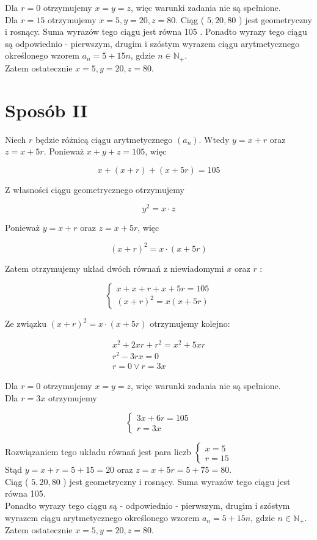 \documentclass[10pt]{article}
\begin{document}
Dla $r=0$ otrzymujemy $x=y=z$, więc warunki zadania nie są spełnione.\\
Dla $r=15$ otrzymujemy $x=5, y=20, z=80$. Ciąg ( $5,20,80$ ) jest geometryczny i rosnący. Suma wyrazów tego ciągu jest równa 105 . Ponadto wyrazy tego ciągu są odpowiednio - pierwszym, drugim i szóstym wyrazem ciągu arytmetycznego określonego wzorem $a_{n}=5+15 n$, gdzie $n \in \mathbb{N}_{+}$.\\
Zatem ostatecznie $x=5, y=20, z=80$.

\section*{Sposób II}
Niech $r$ będzie różnicą ciągu arytmetycznego $\left(a_{n}\right)$. Wtedy $y=x+r$ oraz $z=x+5 r$. Ponieważ $x+y+z=105$, więc

$$
x+(x+r)+(x+5 r)=105
$$

Z własności ciągu geometrycznego otrzymujemy

$$
y^{2}=x \cdot z
$$

Ponieważ $y=x+r$ oraz $z=x+5 r$, więc

$$
(x+r)^{2}=x \cdot(x+5 r)
$$

Zatem otrzymujemy układ dwóch równań z niewiadomymi $x$ oraz $r$ :

$$
\left\{\begin{array}{l}
x+x+r+x+5 r=105 \\
(x+r)^{2}=x(x+5 r)
\end{array}\right.
$$

Ze związku $(x+r)^{2}=x \cdot(x+5 r)$ otrzymujemy kolejno:

$$
\begin{gathered}
x^{2}+2 x r+r^{2}=x^{2}+5 x r \\
r^{2}-3 r x=0 \\
r=0 \vee r=3 x
\end{gathered}
$$

Dla $r=0$ otrzymujemy $x=y=z$, więc warunki zadania nie są spełnione.\\
Dla $r=3 x$ otrzymujemy

$$
\left\{\begin{array}{l}
3 x+6 r=105 \\
r=3 x
\end{array}\right.
$$

Rozwiązaniem tego układu równań jest para liczb $\left\{\begin{array}{l}x=5 \\ r=15\end{array}\right.$\\
Stąd $y=x+r=5+15=20$ oraz $z=x+5 r=5+75=80$.\\
Ciąg ( $5,20,80$ ) jest geometryczny i rosnący. Suma wyrazów tego ciągu jest równa 105.\\
Ponadto wyrazy tego ciągu są - odpowiednio - pierwszym, drugim i szóstym wyrazem ciągu arytmetycznego określonego wzorem $a_{n}=5+15 n$, gdzie $n \in \mathbb{N}_{+}$.\\
Zatem ostatecznie $x=5, y=20, z=80$.
\end{document}
